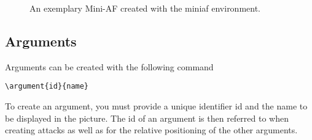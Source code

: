 \documentclass{article}
\begin{document}
\begin{figure}[ht]
    \centering
    \begin{miniaf}





    \end{miniaf}
    \caption{An exemplary Mini-AF created with the \textsf{miniaf} environment.}
    \label{fig:example_mini}
\end{figure}


\subsection{Arguments}
    Arguments can be created with the following command

    \verb|\argument{id}{name}|

    \noindent
    To create an argument, you must provide a unique identifier \textsf{id} and the \textsf{name} to be displayed in the picture.
    The \textsf{id} of an argument is then referred to when creating attacks as well as for the relative positioning of the other arguments.
\end{document}
